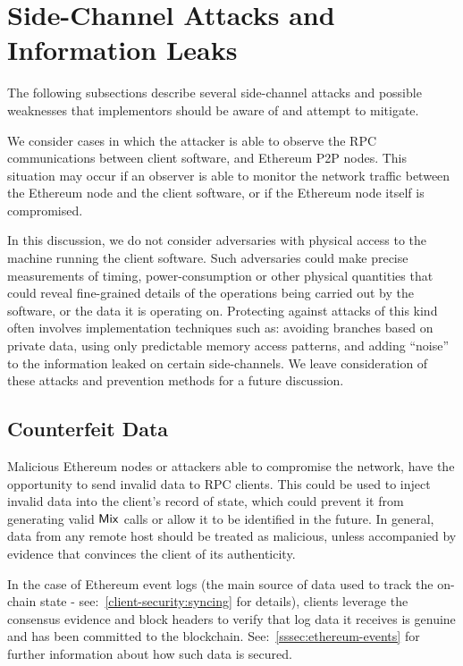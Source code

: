 
\chapter{Side-Channel Attacks and Information Leaks}\label{appendix:sca-attacks}

The following subsections describe several side-channel attacks and possible weaknesses that implementors should be aware of and attempt to mitigate.

We consider cases in which the attacker is able to observe the RPC communications between \zeth{} client software, and Ethereum P2P nodes. This situation may occur if an observer is able to monitor the network traffic between the Ethereum node and the \zeth{} client software, or if the Ethereum node itself is compromised.

\begin{notebox}
In this discussion, we do not consider adversaries with physical access to the machine running the client software. Such adversaries could make precise measurements of timing, power-consumption or other physical quantities that could reveal fine-grained details of the operations being carried out by the software, or the data it is operating on. Protecting against attacks of this kind often involves implementation techniques such as: avoiding branches based on private data, using only predictable memory access patterns, and adding ``noise'' to the information leaked on certain side-channels. We leave consideration of these attacks and prevention methods for a future discussion.
\end{notebox}

\section{Counterfeit Data}\label{appendix:sca-attacks:counterfeit-data}

Malicious Ethereum nodes or attackers able to compromise the network, have the opportunity to send invalid data to RPC clients. This could be used to inject invalid data into the client's record of state, which could prevent it from generating valid $\mathsf{Mix}$ calls or allow it to be identified in the future. In general, data from any remote host should be treated as malicious, unless accompanied by evidence that convinces the client of its authenticity.

In the case of Ethereum event logs (the main source of data used to track the on-chain state - see:~\cref{client-security:syncing} for details), clients \MUST{} leverage the consensus evidence and block headers to verify that log data it receives is genuine and has been committed to the blockchain. See:~\cref{sssec:ethereum-events} for further information about how such data is secured.

